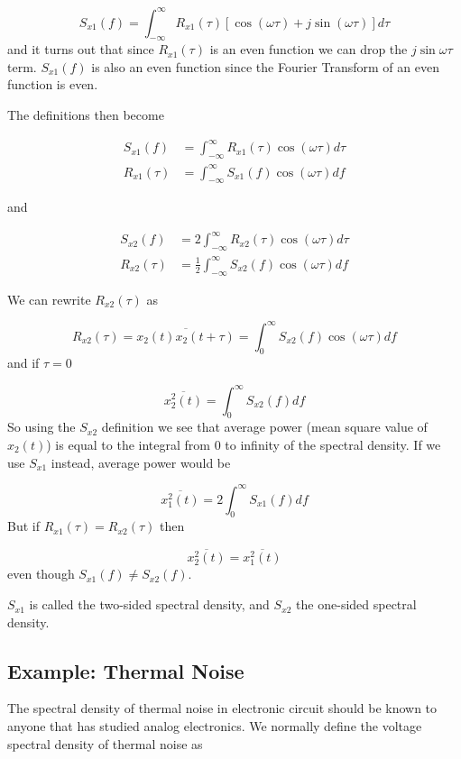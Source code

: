 \[S_{x1}(f) = \int_{-\infty}^{\infty}{R_{x1}(\tau)[\cos(\omega \tau) + j \sin( \omega
  \tau)]d\tau}\] and it turns out that since \(R_{x1}(\tau)\) is an even
function we can drop the \(j\sin{\omega \tau}\) term. \(S_{x1}(f)\) is
also an even function since the Fourier Transform of an even function is
even.

The definitions then become

\[\begin{aligned}
S_{x1}(f) &= \int_{-\infty}^{\infty}{R_{x1}(\tau)\cos(\omega\tau)d\tau}\\
R_{x1}(\tau) &= \int_{-\infty}^{\infty}{S_{x1}(f)\cos(\omega\tau)df}
\end{aligned}\]

and

\[\begin{aligned}
S_{x2}(f) &= 2\int_{-\infty}^{\infty}{R_{x2}(\tau)\cos(\omega\tau)d\tau}\\
R_{x2}(\tau) &= \frac{1}{2}\int_{-\infty}^{\infty}{S_{x2}(f)\cos(\omega\tau)df}
\end{aligned}\]

We can rewrite \(R_{x2}(\tau)\) as

\[R_{x2}(\tau) = \overline{x_2(t)x_2(t + \tau)} = \int_0^{\infty}{S_{x2}(f)\cos(\omega\tau)df}\]
and if \(\tau = 0\)

\[\overline{x_2^2(t)} = \int_0^{\infty}{S_{x2}(f)df}\] So using the
\(S_{x2}\) definition we see that average power (mean square value of
\(x_2(t)\)) is equal to the integral from 0 to infinity of the spectral
density. If we use \(S_{x1}\) instead, average power would be

\[\overline{x_1^2(t)} = 2\int_0^{\infty}{S_{x1}(f)df}\] But if
\(R_{x1}(\tau) = R_{x2}(\tau)\) then

\[\overline{x_2^2(t)} = \overline{x_1^2(t)}\] even though
\(S_{x1}(f) \neq S_{x2}(f)\).

\(S_{x1}\) is called the two-sided spectral density, and \(S_{x2}\) the
one-sided spectral density.

\subsection{Example: Thermal Noise}\label{example-thermal-noise}

The spectral density of thermal noise in electronic circuit should be
known to anyone that has studied analog electronics. We normally define
the voltage spectral density of thermal noise as

